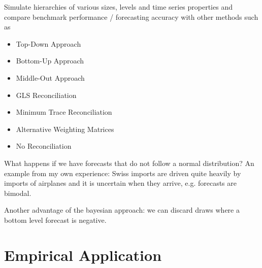 \documentclass[a4paper,fleqn,11pt]{article}
\begin{document}
Simulate hierarchies of various sizes, levels and time series properties and compare benchmark performance / forecasting accuracy with other methods such as
\begin{itemize}
    \item Top-Down Approach
    \item Bottom-Up Approach
    \item Middle-Out Approach
    \item GLS Reconciliation \cite{Hyndman2011}
    \item Minimum Trace Reconciliation \cite{Wickramasuriya2015}
    \item Alternative Weighting Matrices
    \item No Reconciliation\\
\end{itemize}

What happens if we have forecasts that do not follow a normal distribution? An example from my own experience: Swiss imports are driven quite heavily by imports of airplanes and it is uncertain when they arrive, e.g. forecasts are bimodal.

Another advantage of the bayesian approach: we can discard draws where a bottom level forecast is negative.

\clearpage

\section{Empirical Application}
\end{document}
